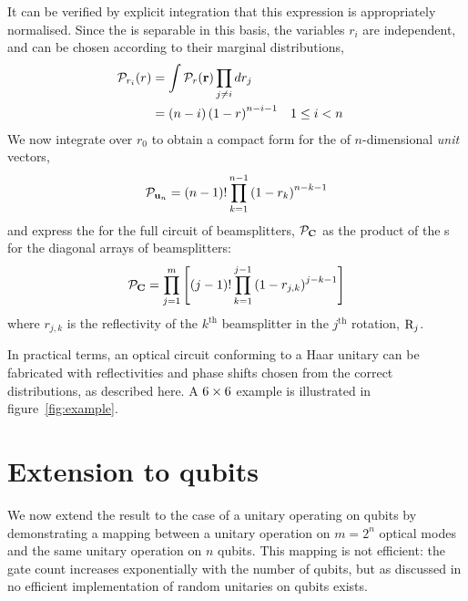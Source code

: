 It can be verified by explicit integration that this expression is appropriately
normalised. Since the \pdf{} is separable in this basis, the variables \( r_i
\) are independent, and can be chosen according to their marginal distributions,
\begin{align}
  \mathcal{P}_{r_{i}} \!\left(r\right) &= \int \mathcal{P}_{r} \!\left(\mathbf{r}\right) \prod_{j \neq i}
    dr_{j}\\
  &= \left( n-i \right) \left( 1-r \right)^{n-i-1} &&
  1 \leq i < n
\end{align}
We now integrate over \(r_{0}\) to obtain a compact form for the \pdf{} of
\(n\)-dimensional \emph{unit} vectors,
\begin{equation}
  \mathcal{P}_{ \mathbf{u}_n } = \left( n-1 \right)! \prod_{k=1}^{n-1} \left( 1-r_k
  \right)^{n-k-1}
\end{equation}
and express the \pdf{} for the full circuit of beamsplitters,
\(\mathcal{P}_{\mathbf{C}}\) as the product of the \pdf{}s for the diagonal arrays of
beamsplitters:
\begin{equation}
  \mathcal{P}_{\mathbf{C}} = \prod_{j=1}^{m} \left[ \left( j-1 \right)!
  \prod_{k=1}^{j-1} \left( 1-r_{j,k} \right)^{j-k-1} \right]
\end{equation}
where \( r_{j,k} \) is the reflectivity of the \( k^{\text{th}} \) beamsplitter
in the \( j^{\text{th}} \) rotation, \( \mathrm{R}_j \).

In practical terms, an optical circuit conforming to a Haar unitary can be
fabricated with reflectivities and phase shifts chosen from the correct
distributions, as described here. A \( 6 \times 6 \) example is illustrated in
figure~\ref{fig:example}.

\section{Extension to qubits}
\label{sec:Qubits}
We now extend the result to the case of a unitary operating on qubits by
demonstrating a mapping between a unitary operation on \(m=2^{n}\) optical
modes and the same unitary operation on \(n\) qubits. This mapping is not
efficient: the gate count increases exponentially with the number of qubits, but
as discussed in \cite{random-unitaries} no efficient implementation of random
unitaries on qubits exists.

